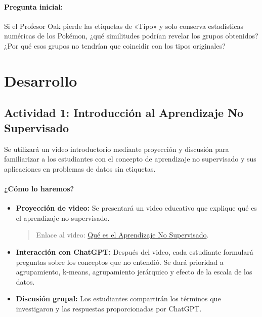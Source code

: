 \documentclass[a4,11pt]{aleph-notas}
\begin{document}
\paragraph{Pregunta inicial:} 
Si el Profesor Oak pierde las etiquetas de «Tipo» y solo conserva estadísticas numéricas de los Pokémon, ¿qué similitudes podrían revelar los grupos obtenidos? ¿Por qué esos grupos no tendrían que coincidir con los tipos originales?

\section*{Desarrollo}

\subsection*{Actividad 1: Introducción al Aprendizaje No Supervisado}

Se utilizará un video introductorio mediante proyección y discusión para familiarizar a los estudiantes con el concepto de aprendizaje no supervisado y sus aplicaciones en problemas de datos sin etiquetas.

\paragraph{¿Cómo lo haremos?}  
\begin{itemize}[leftmargin=*]
    \item \textbf{Proyección de video:}  
    Se presentará un video educativo que explique qué es el aprendizaje no supervisado.
    \begin{quote}
        Enlace al video: \href{https://www.youtube.com/watch?v=WM7XaTyX7O8}{Qué es el Aprendizaje No Supervisado}.
    \end{quote}
    
    \item \textbf{Interacción con ChatGPT:}  
    Después del video, cada estudiante formulará preguntas sobre los conceptos que no entendió. Se dará prioridad a agrupamiento, k-means, agrupamiento jerárquico y efecto de la escala de los datos.
    
    \item \textbf{Discusión grupal:}
    Los estudiantes compartirán los términos que investigaron y las respuestas proporcionadas por ChatGPT.
\end{itemize}
\end{document}
